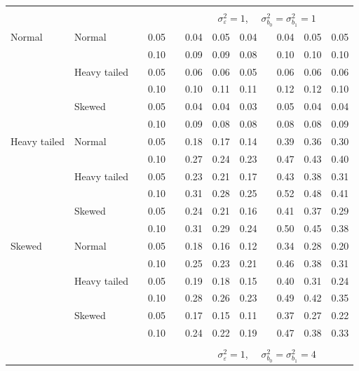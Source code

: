 \documentclass[12pt]{article} %
\begin{document}
\begin{table}[ht]
\begin{scriptsize}
\begin{center}
\begin{tabular}{ll p{.1cm} c p{.1cm} rrr p{.1cm} rrr}
&&&&&&&&&&&\\
& && && \multicolumn{7}{c}{$\sigma_{\varepsilon}^2 = 1$, \ \ $\sigma_{b_0}^2 = \sigma_{b_1}^2 = 1$} \\ \cline{6-12}
Normal       & Normal       && 0.05 &&   0.04 & 0.05 & 0.04 && 0.04 & 0.05 & 0.05 \\ 
             &              && 0.10 &&   0.09 & 0.09 & 0.08 && 0.10 & 0.10 & 0.10 \\ 
             & Heavy tailed && 0.05 &&   0.06 & 0.06 & 0.05 && 0.06 & 0.06 & 0.06 \\ 
             &              && 0.10 &&   0.10 & 0.11 & 0.11 && 0.12 & 0.12 & 0.10 \\ 
             & Skewed       && 0.05 &&   0.04 & 0.04 & 0.03 && 0.05 & 0.04 & 0.04 \\ 
             &              && 0.10 &&   0.09 & 0.08 & 0.08 && 0.08 & 0.08 & 0.09 \\ 
Heavy tailed & Normal       && 0.05 &&   0.18 & 0.17 & 0.14 && 0.39 & 0.36 & 0.30 \\ 
             &              && 0.10 &&   0.27 & 0.24 & 0.23 && 0.47 & 0.43 & 0.40 \\ 
             & Heavy tailed && 0.05 &&   0.23 & 0.21 & 0.17 && 0.43 & 0.38 & 0.31 \\ 
             &              && 0.10 &&   0.31 & 0.28 & 0.25 && 0.52 & 0.48 & 0.41 \\ 
             & Skewed       && 0.05 &&   0.24 & 0.21 & 0.16 && 0.41 & 0.37 & 0.29 \\ 
             &              && 0.10 &&   0.31 & 0.29 & 0.24 && 0.50 & 0.45 & 0.38 \\ 
Skewed       & Normal       && 0.05 &&   0.18 & 0.16 & 0.12 && 0.34 & 0.28 & 0.20 \\ 
             &              && 0.10 &&   0.25 & 0.23 & 0.21 && 0.46 & 0.38 & 0.31 \\ 
             & Heavy tailed && 0.05 &&   0.19 & 0.18 & 0.15 && 0.40 & 0.31 & 0.24 \\ 
             &              && 0.10 &&   0.28 & 0.26 & 0.23 && 0.49 & 0.42 & 0.35 \\ 
             & Skewed       && 0.05 &&   0.17 & 0.15 & 0.11 && 0.37 & 0.27 & 0.22 \\ 
             &              && 0.10 &&   0.24 & 0.22 & 0.19 && 0.47 & 0.38 & 0.33 \\ 


&&&&&&&&&&&\\
& && && \multicolumn{7}{c}{$\sigma_{\varepsilon}^2 = 1$, \ \ $\sigma_{b_0}^2 = \sigma_{b_1}^2 = 4$} \\ \cline{6-12}

\hline
\end{tabular}
\end{center}
\end{scriptsize}
\end{table}
\end{document}

